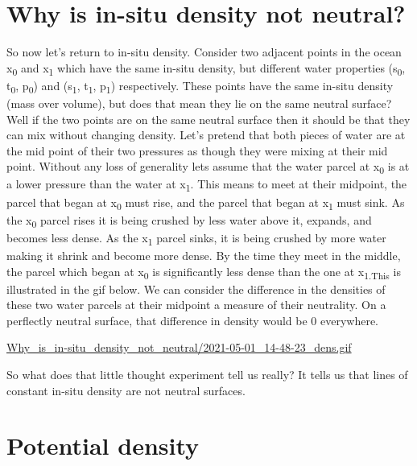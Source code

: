 \documentclass[11pt]{article}
\begin{document}
\section{Why is in-situ density not neutral?}
\label{sec:orgdbc8e96}
So now let's return to in-situ density. Consider two adjacent points in the ocean x\textsubscript{0} and x\textsubscript{1} which have the same in-situ density, but different water properties (s\textsubscript{0}, t\textsubscript{0}, p\textsubscript{0}) and (s\textsubscript{1}, t\textsubscript{1}, p\textsubscript{1}) respectively. These points have the same in-situ density (mass over volume), but does that mean they lie on the same neutral surface? Well if the two points are on the same neutral surface then it should be that they can mix without changing density. Let's pretend that both pieces of water are at the mid point of their two pressures as though they were mixing at their mid point. Without any loss of generality lets assume that the water parcel at x\textsubscript{0} is at a lower pressure than the water at x\textsubscript{1}. This means to meet at their midpoint, the parcel that began at x\textsubscript{0} must rise, and the parcel that began at x\textsubscript{1} must sink. As the x\textsubscript{0} parcel rises it is being crushed by less water above it, expands, and becomes less dense. As the x\textsubscript{1} parcel sinks, it is being crushed by more water making it shrink and become more dense. By the time they meet in the middle, the parcel which began at x\textsubscript{0} is significantly less dense than the one at x\textsubscript{1.This} is illustrated in the gif below. We can consider the difference in the densities of these two water parcels at their midpoint a measure of their neutrality. On a perflectly neutral surface, that difference in density would be 0 everywhere.  

\url{Why\_is\_in-situ\_density\_not\_neutral/2021-05-01\_14-48-23\_dens.gif}

So what does that little thought experiment tell us really? It tells us that lines of constant in-situ density are not neutral surfaces.

\section{Potential density}
\label{sec:org077242b}
\end{document}
